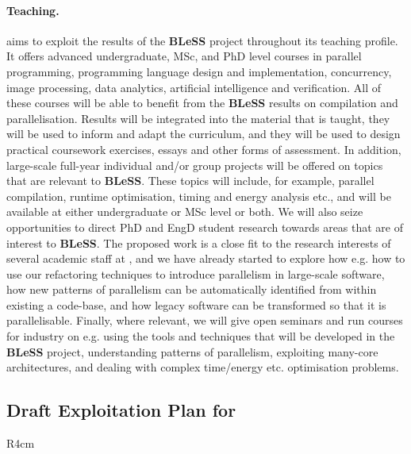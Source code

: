 \documentclass[a4paper,11pt]{article}
\newcommand{\project}[1]{\textbf{#1}\xspace}
\newcommand{\BLESS}{\project{BLeSS}}
\newcommand{\TheProject}{\BLESS}
\begin{document}
\paragraph{Teaching.}
\SAshort{} aims to exploit the results of the \TheProject{} project
throughout its teaching profile.  It offers advanced undergraduate,
MSc, and PhD level courses in parallel programming, programming language design
and implementation, concurrency, image processing, data analytics, artificial intelligence and verification.
All of these courses will be able to benefit from the \TheProject{}
results on compilation and parallelisation.  Results will be integrated into
the material that is taught, they will be used to inform and adapt the
curriculum, and they will be used to design practical coursework exercises,
essays and other forms of assessment.
In addition, large-scale full-year individual and/or group
projects will be offered on topics that are relevant to \TheProject{}.
These topics will include, for example, parallel compilation, runtime optimisation,
timing and energy analysis etc., and will be available at either undergraduate or MSc level
or both.
We will also seize opportunities to direct PhD and EngD student research towards
areas that are of interest to \TheProject.  The proposed work is a close
fit to the research interests of several academic staff at \SA{}, and
we have already started to explore how e.g. 
how to use our refactoring techniques to introduce parallelism in large-scale software,
how new patterns of parallelism can be automatically
identified from within existing a code-base, and how legacy software can be transformed so that
it is parallelisable.
Finally, where relevant, we will give open seminars and
run courses for industry on e.g. using the tools and techniques that will be developed in the \TheProject{} project,
understanding patterns of parallelism, exploiting many-core architectures, and dealing with complex time/energy etc. optimisation problems.

\pagebreak
\horizontalline
\subsection*{Draft Exploitation Plan for \INRIAshort{}}
\vspace{-6pt}

\begin{wrapfigure}{R}{4cm}
\vspace{-1.4cm}
\hfill {}
\vspace{-1cm}
\end{wrapfigure}
\end{document}
